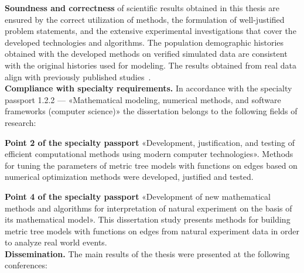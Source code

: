 \textbf{Soundness and correctness} of scientific results obtained in this thesis are ensured by the correct utilization of methods, the formulation of well-justified problem statements, and the extensive experimental investigations that cover the developed technologies and algorithms.
The population demographic histories obtained with the developed methods on verified simulated data are consistent with the original histories used for modeling.
The results obtained from real data align with previously published studies~\cite{gutenkunst2009inferring, jouganous2017inferring, nielsen2017tracing, verissimo2017world, king2015genetic, сивцева2020геном}.\\

\textbf{Compliance with specialty requirements.}
In accordance with the specialty passport 1.2.2 --- «Mathematical modeling, numerical methods, and software frameworks (computer science)» the dissertation belongs to the following fields of research:

\textbf{Point 2 of the specialty passport} «Development, justification, and testing of efficient computational methods using modern computer technologies».
Methods for tuning the parameters of metric tree models with functions on edges based on numerical optimization methods were developed, justified and tested.

\textbf{Point 4 of the specialty passport} «Development of new mathematical methods and algorithms for interpretation of natural experiment on the basis of its mathematical model».
This dissertation study presents methods for building metric tree models with functions on edges from natural experiment data in order to analyze real world events.\\


\newpage
\textbf{Dissemination.}
The main results of the thesis were presented at the following conferences:

